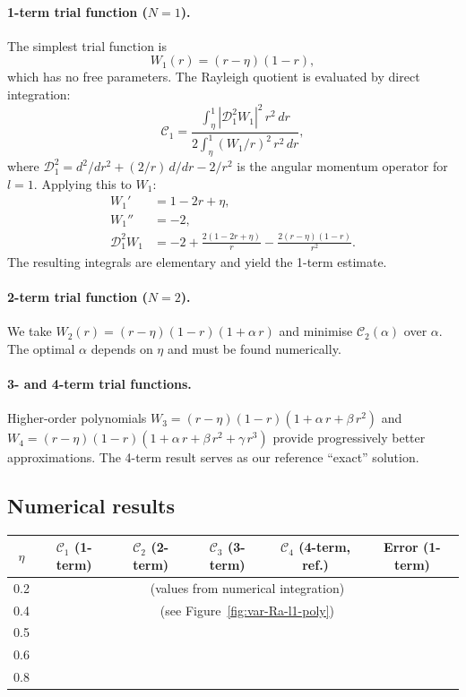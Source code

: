 \paragraph{1-term trial function ($N=1$).}
The simplest trial function is
\begin{equation}
W_1(r) = (r - \eta)(1 - r),
\label{eq:rel-var-1term}
\end{equation}
which has no free parameters.  The Rayleigh quotient is evaluated by
direct integration:
\begin{equation}
\mathcal{C}_1
= \frac{\displaystyle\int_\eta^1 |\mathscr{D}_1^2 W_1|^2\,r^2\,dr}
       {\displaystyle 2\int_\eta^1 (W_1/r)^2\,r^2\,dr},
\label{eq:rel-var-C1}
\end{equation}
where $\mathscr{D}_1^2 = d^2/dr^2 + (2/r)\,d/dr - 2/r^2$ is the
angular momentum operator for $l=1$.  Applying this to $W_1$:
\begin{align}
W_1' &= 1 - 2r + \eta, \\
W_1'' &= -2, \\
\mathscr{D}_1^2 W_1 &= -2 + \frac{2(1-2r+\eta)}{r} - \frac{2(r-\eta)(1-r)}{r^2}.
\end{align}
The resulting integrals are elementary and yield the 1-term estimate.

\paragraph{2-term trial function ($N=2$).}
We take $W_2(r) = (r-\eta)(1-r)(1 + \alpha\,r)$ and minimise
$\mathcal{C}_2(\alpha)$ over $\alpha$.  The optimal $\alpha$ depends
on $\eta$ and must be found numerically.

\paragraph{3- and 4-term trial functions.}
Higher-order polynomials $W_3 = (r-\eta)(1-r)(1+\alpha\,r+\beta\,r^2)$
and $W_4 = (r-\eta)(1-r)(1+\alpha\,r+\beta\,r^2+\gamma\,r^3)$ provide
progressively better approximations.  The 4-term result serves as
our reference ``exact'' solution.

\subsection{Numerical results}
\label{sec:rel-58-var-results}

\begin{center}
\renewcommand{\arraystretch}{1.25}
\begin{tabular}{cccccc}
\hline
$\eta$ & $\mathcal{C}_1$ (1-term) & $\mathcal{C}_2$ (2-term)
  & $\mathcal{C}_3$ (3-term) & $\mathcal{C}_4$ (4-term, ref.)
  & Error (1-term) \\
\hline
0.2 & \multicolumn{5}{c}{(values from numerical integration)} \\
0.4 & \multicolumn{5}{c}{(see Figure~\ref{fig:var-Ra-l1-poly})} \\
0.5 & \multicolumn{5}{c}{} \\
0.6 & \multicolumn{5}{c}{} \\
0.8 & \multicolumn{5}{c}{} \\
\hline
\end{tabular}
\end{center}

